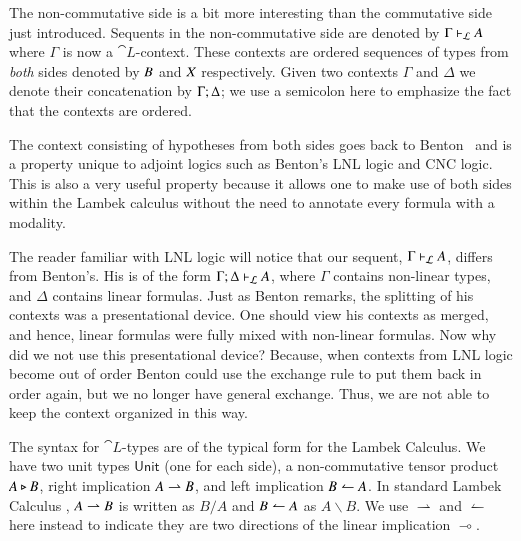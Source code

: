 The non-commutative side is a bit more interesting than the commutative side
just introduced. Sequents in the non-commutative side are denoted by
$\Gamma  \vdash_\mathcal{L}  \mathit{A}$ where $\Gamma$ is now a $\cat{L}$-context. These contexts are
ordered sequences of types from \emph{both} sides denoted by $\mathit{B}$ and
$\mathit{X}$ respectively. Given two contexts $\Gamma$ and $\Delta$ we denote their
concatenation by $\Gamma  ;  \Delta$; we use a semicolon here to emphasize the fact
that the contexts are ordered.

The context consisting of hypotheses from both sides goes back to
Benton~\cite{Benton:1994} and is a property unique to adjoint logics such as
Benton's LNL logic and CNC logic. This is also a very useful property
because it allows one to make use of both sides within the Lambek calculus
without the need to annotate every formula with a modality.

The reader familiar with LNL logic will notice that our sequent,
$\Gamma  \vdash_\mathcal{L}  \mathit{A}$, differs from Benton's. His is of the form $\Gamma  ;  \Delta  \vdash_\mathcal{L}  \mathit{A}$,
where $\Gamma$ contains non-linear types, and $\Delta$ contains linear
formulas. Just as Benton remarks, the splitting of his contexts was a
presentational device. One should view his contexts as merged, and hence,
linear formulas were fully mixed with non-linear formulas. Now why did we
not use this presentational device? Because, when contexts from LNL logic
become out of order Benton could use the exchange rule to put them back in
order again, but we no longer have general exchange. Thus, we are not able
to keep the context organized in this way.

The syntax for $\cat{L}$-types are of the typical form for the Lambek
Calculus. We have two unit types $ \mathsf{Unit} $ (one for each side), a
non-commutative tensor product $\mathit{A}  \triangleright  \mathit{B}$, right implication $\mathit{A}  \rightharpoonup  \mathit{B}$, and left implication $\mathit{B}  \leftharpoonup  \mathit{A}$. In standard Lambek
Calculus \cite{Pentus1995}, $\mathit{A}  \rightharpoonup  \mathit{B}$ is written as $B / A$ and
$\mathit{B}  \leftharpoonup  \mathit{A}$ as $A \backslash B$. We use $\rightharpoonup$ and
$\leftharpoonup$ here instead to indicate they are two directions of
the linear implication $\multimap$.

